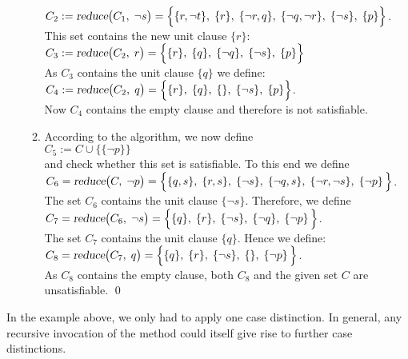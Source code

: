 \begin{enumerate}
\begin{enumerate}
            $C_2 := \textsl{reduce}\bigl(C_1,\;\neg s\bigr) = 
                    \Big\{ \{r, \neg t\},\; \{r\},\; \{\neg r, q\},\; 
                           \{\neg q, \neg r\},\; \{ \neg s\},\; \{p\} 
                    \Big\}$.
            \\[0.2cm]
            This set contains the new unit clause $\{r\}$:
            \\[0.2cm]
            \hspace*{1.3cm} 
            $C_3 := \textsl{reduce}\bigl(C_2,\; r\bigr) = 
                    \Big\{ \{r\},\; \{q\},\; \{\neg q\},\; \{ \neg s\},\; \{p\} \Big\}$
            \\[0.2cm]
            As $C_3$ contains the unit clause $\{q\}$       
            we define: \\[0.2cm]
            \hspace*{1.3cm} 
            $C_4 := \textsl{reduce}\bigl(C_2,\;q\bigr) = 
              \Big\{ \{r\},\; \{q\},\; \{\},\; \{ \neg s\},\; \{p\} \Big\}$.
            \\[0.2cm]
            Now $C_4$ contains the empty clause and therefore is not satisfiable.    
      \item According to the algorithm, we now define \\[0.2cm]
            \hspace*{1.3cm} 
            $C_5 := C \cup \bigl\{ \{\neg p\} \bigr\}$ \\[0.2cm]
            and check whether this set is satisfiable.  To this end we define
            \\[0.2cm]
            \hspace*{1.3cm} 
            $C_6 = \textsl{reduce}\bigl(C,\; \neg p\bigr) =
            \Big\{ \{q, s\},\; \{r, s\},\;\{\neg s\},\; 
                \{\neg q, s\},\; \{\neg r, \neg s\},\;\{\neg p\}\, \Big\}$.
            \\[0.2cm]
            The set $C_6$ contains the unit clause  $\{\neg s\}$.  Therefore, we define
            \\[0.2cm]
            \hspace*{1.3cm} 
            $C_7 = \textsl{reduce}\bigl(C_6,\; \neg s\bigr) =
                   \Big\{ \{q\},\; \{r\},\;\{\neg s\},\; \{\neg q\},\;\{\neg p\}\, 
             \Big\}$.
            \\[0.2cm]
            The set  $C_7$ contains the unit clause $\{q\}$. Hence we define:\\[0.2cm]
            \hspace*{1.3cm} 
            $C_8 = \textsl{reduce}\bigl(C_7,\; q \bigr) =
             \Big\{ \{q\},\; \{r\},\;\{\neg s\},\; \{\},\;\{\neg p\}\, \Big\}$.
            \\[0.2cm]
            As $C_8$ contains the empty clause, both  $C_8$ and the given set $C$ are
            unsatisfiable.
            \qed
      \end{enumerate}
\end{enumerate}
In the example above, we only had to apply one case distinction.  In general, any
recursive invocation of the method could itself give rise to further case distinctions.
\pagebreak

